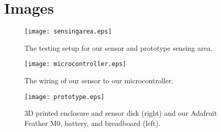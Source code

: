 \documentclass[letterpaper,10pt,draftclsnofoot,onecolumn]{article}
\begin{document}
\vspace{4mm}
\section{Images}

\begin{figure}[H]
\centering
    \texttt{[image: sensingarea.eps]}
    \caption{The testing setup for our sensor and prototype sensing area.}
\end{figure}

\vspace{4mm}

\begin{figure}[H]
\centering
    \texttt{[image: microcontroller.eps]}
    \caption{The wiring of our sensor to our microcontroller.}
\end{figure}

\vspace{4mm}

\begin{figure}[H]
\centering
    \texttt{[image: prototype.eps]}
    \caption{3D printed enclosure and sensor disk (right) and our Adafruit Feather M0, battery, and breadboard (left).}
\end{figure}



\end{document}
